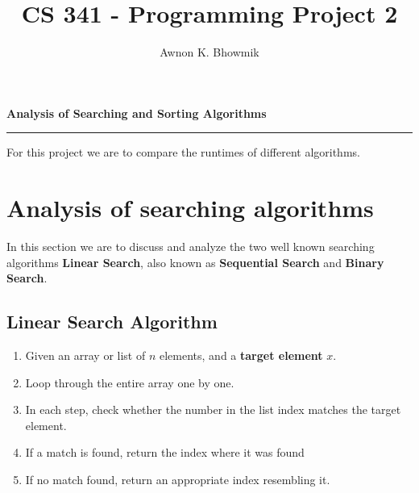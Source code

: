 \documentclass[a4paper, 12pt]{article}
\title{CS 341 - Programming Project 2}
\author{Awnon K. Bhowmik}
\begin{document}
	\maketitle
	
	\begin{center}
		\textbf{Analysis of Searching and Sorting Algorithms}
		\noindent\rule{\textwidth}{1pt}
	\end{center}
	
	\begin{flushleft}
	For this project we are to compare the runtimes of different algorithms.
	\end{flushleft}
	
	
	\section*{Analysis of searching algorithms}
	\begin{flushleft}
	In this section we are to discuss and analyze the two well known searching algorithms \textbf{Linear Search}, also known as \textbf{Sequential Search} and \textbf{Binary Search}.
	\end{flushleft}
	
	\subsection*{Linear Search Algorithm}
	\begin{enumerate}
		\item Given an array or list of $n$ elements, and a \textbf{target element} $x$.
		\item Loop through the entire array one by one.
		\item In each step, check whether the number in the list index matches the target element.
		\item If a match is found, return the index where it was found
		\item If no match found, return an appropriate index resembling it.
	\end{enumerate}
	
\end{document}
